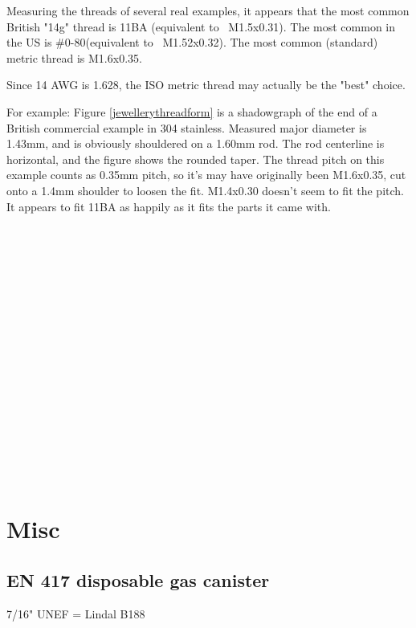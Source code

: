 Measuring the threads of several real examples, it appears that the most common British "14g" thread is 11BA (equivalent to ~M1.5x0.31).  The most common in the US is \#0-80(equivalent to ~M1.52x0.32).  The most common (standard) metric thread is M1.6x0.35.

Since 14 AWG is 1.628, the ISO metric thread may actually be the "best" choice.

For example: Figure \ref{jewellerythreadform} is a shadowgraph of the end of a British commercial example in 304 stainless.  Measured major diameter is 1.43mm, and is obviously shouldered on a 1.60mm rod. The rod centerline is horizontal, and the figure shows the rounded taper.  The thread pitch on this example counts as 0.35mm pitch, so it's may have originally been M1.6x0.35, cut onto a 1.4mm shoulder to loosen the fit.  M1.4x0.30 doesn't seem to fit the pitch.  It appears to fit 11BA as happily as it fits the parts it came with.
\\ \\ \\ \\ \\ \\ \\ \\ \\ \\ \\ \\ \\ \\ \\ \\ \\ \\               



\clearpage
\section{Misc}
\subsection{EN 417 disposable gas canister}
7/16" UNEF = Lindal B188 
\clearpage
